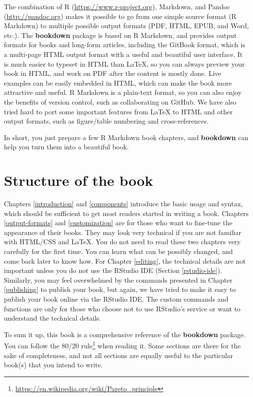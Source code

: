 \documentclass[
  10pt,
]{krantz}
\renewcommand{\href}[2]{#2\footnote{\url{#1}}}
\begin{document}
The combination of R (\url{https://www.r-project.org}), Markdown, and Pandoc (\url{http://pandoc.org}) makes it possible to go from one simple source format (R Markdown) to multiple possible output formats (PDF, HTML, EPUB, and Word, etc.). The \textbf{bookdown} package is based on R Markdown, and provides output formats for books and long-form articles, including the GitBook format, which is a multi-page HTML output format with a useful and beautiful user interface. It is much easier to typeset in HTML than LaTeX, so you can always preview your book in HTML, and work on PDF after the content is mostly done. Live examples can be easily embedded in HTML, which can make the book more attractive and useful. R Markdown is a plain-text format, so you can also enjoy the benefits of version control, such as collaborating on GitHub. We have also tried hard to port some important features from LaTeX to HTML and other output formats, such as figure/table numbering and cross-references.

In short, you just prepare a few R Markdown book chapters, and \textbf{bookdown} can help you turn them into a beautiful book.

\section*{Structure of the book}\label{structure-of-the-book}


Chapters \ref{introduction} and \ref{components} introduce the basic usage and syntax, which should be sufficient to get most readers started in writing a book. Chapters \ref{output-formats} and \ref{customization} are for those who want to fine-tune the appearance of their books. They may look very technical if you are not familiar with HTML/CSS and LaTeX. You do not need to read these two chapters very carefully for the first time. You can learn what can be possibly changed, and come back later to know how. For Chapter \ref{editing}, the technical details are not important unless you do not use the RStudio IDE (Section \ref{rstudio-ide}). Similarly, you may feel overwhelmed by the commands presented in Chapter \ref{publishing} to publish your book, but again, we have tried to make it easy to publish your book online via the RStudio IDE. The custom commands and functions are only for those who choose not to use RStudio's service or want to understand the technical details.

To sum it up, this book is a comprehensive reference of the \textbf{bookdown} package. You can follow the \href{https://en.wikipedia.org/wiki/Pareto_principle}{80/20 rule} when reading it. Some sections are there for the sake of completeness, and not all sections are equally useful to the particular book(s) that you intend to write.
\end{document}
